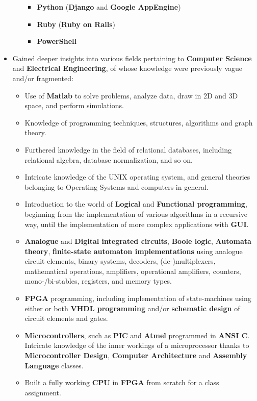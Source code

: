 \documentclass[12pt,a4paper]{article}
\begin{document}
\begin{itemize}
\begin{itemize}
\begin{itemize}
			\item	\textbf{Python} (\textbf{Django} and \textbf{Google AppEngine})
			\item	\textbf{Ruby} (\textbf{Ruby on Rails})
			\item	\textbf{PowerShell}
			\end{itemize}
		\end{itemize}
	\item	Gained deeper insights into various fields pertaining to \textbf{Computer Science} and \textbf{Electrical Engineering}, of whose knowledge were previously vague and/or fragmented:
		\begin{itemize}
		\item	Use of \textbf{Matlab} to solve problems, analyze data, draw in 2D and 3D space, and perform simulations.
		\item	Knowledge of programming techniques, structures, algorithms and graph theory.
		\item	Furthered knowledge in the field of relational databases, including relational algebra, database normalization, and so on.
		\item	Intricate knowledge of the UNIX operating system, and general theories belonging to Operating Systems and computers in general.
		\item	Introduction to the world of \textbf{Logical} and \textbf{Functional programming}, beginning from the implementation of various algorithms in a recursive way, until the implementation of more complex applications with \textbf{GUI}.
		\item	\textbf{Analogue} and \textbf{Digital integrated circuits}, \textbf{Boole logic}, \textbf{Automata theory}, \textbf{finite-state automaton implementations} using analogue circuit elements, binary systems, decoders, (de-)multiplexers, mathematical operations, amplifiers, operational amplifiers, counters, mono-/bi-stables, registers, and memory types.
		\item	\textbf{FPGA} programming, including implementation of state-machines using either or both \textbf{VHDL programming} and/or \textbf{schematic design} of circuit elements and gates.
		\item	\textbf{Microcontrollers}, such as \textbf{PIC} and \textbf{Atmel} programmed in \textbf{ANSI C}. Intricate knowledge of the inner workings of a microprocessor thanks to \textbf{Microcontroller Design}, \textbf{Computer Architecture} and \textbf{Assembly Language} classes.
		\item	Built a fully working \textbf{CPU} in \textbf{FPGA} from scratch for a class assignment.

\end{itemize}
\end{itemize}
\end{document}
